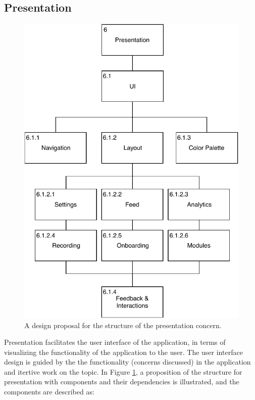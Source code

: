 \subsection{Presentation}\label{soc:presentation}
\begin{figure}
    \centering
    \includegraphics[scale=0.7]{images/Presentation_Design.pdf}
    \caption{A design proposal for the structure of the presentation concern.}
    \label{fig:hta_presentation}
\end{figure}

Presentation facilitates the user interface of the application, in terms of visualizing the functionality of the application to the user. The user interface design is guided by the the functionality (concerns discussed) in the application and itertive work on the topic. In Figure \ref{fig:hta_presentation}, a proposition of the structure for presentation with components and their dependencies is illustrated, and the components are described as:

